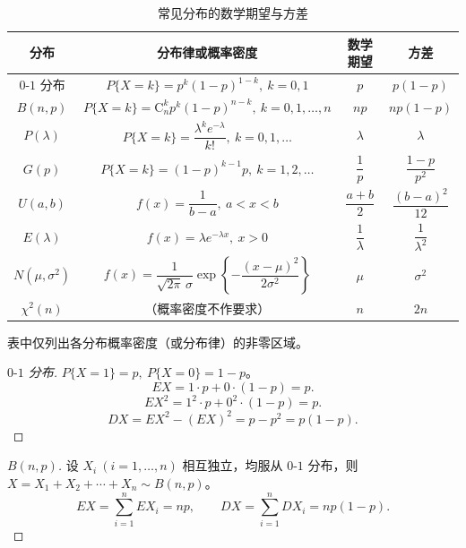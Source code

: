 \documentclass[lang=cn,11pt]{elegantbook}
\begin{document}
\begin{table}[htbp]
    \centering
    \caption{常见分布的数学期望与方差} \label{tab:common-ev}
    \begin{tabular}{cccc}
        \toprule
        分布 & 分布律或概率密度 & 数学期望 & 方差 \\
        \midrule
        \(0\text{-}1\) 分布 & \(P\{X=k\} = p^k(1-p)^{1-k},\ k=0,1\) & \(p\) & \(p(1-p)\) \\[6pt]
        \(B(n,p)\) & \(P\{X=k\} = \mathrm{C}_n^k p^k(1-p)^{n-k},\ k=0,1,\dots,n\) & \(np\) & \(np(1-p)\) \\[6pt]
        \(P(\lambda)\) & \(P\{X=k\} = \dfrac{\lambda^k e^{-\lambda}}{k!},\ k=0,1,\dots\) & \(\lambda\) & \(\lambda\) \\[6pt]
        \(G(p)\) & \(P\{X=k\} = (1-p)^{k-1}p,\ k=1,2,\dots\) & \(\dfrac{1}{p}\) & \(\dfrac{1-p}{p^2}\) \\[6pt]
        \(U(a,b)\) & \(f(x) = \dfrac{1}{b-a},\ a < x < b\) & \(\dfrac{a+b}{2}\) & \(\dfrac{(b-a)^2}{12}\) \\[6pt]
        \(E(\lambda)\) & \(f(x) = \lambda e^{-\lambda x},\ x > 0\) & \(\dfrac{1}{\lambda}\) & \(\dfrac{1}{\lambda^2}\) \\[6pt]
        \(N(\mu,\sigma^2)\) & \(f(x) = \dfrac{1}{\sqrt{2\pi}\,\sigma}\exp\!\left\{-\dfrac{(x-\mu)^2}{2\sigma^2}\right\}\) & \(\mu\) & \(\sigma^2\) \\[6pt]
        $\chi^2(n)$ & （概率密度不作要求） & \(n\) & \(2n\) \\
        \bottomrule
    \end{tabular}
\end{table}

\begin{note}
表中仅列出各分布概率密度（或分布律）的非零区域。
\end{note}

\begin{proof}[\(0\text{-}1\) 分布]
\(P\{X=1\}=p,\ P\{X=0\}=1-p\)。
\[EX = 1\cdot p + 0\cdot(1-p) = p.\]
\[EX^2 = 1^2\cdot p + 0^2\cdot(1-p) = p.\]
\[DX = EX^2 - (EX)^2 = p - p^2 = p(1-p).\]
\end{proof}

\begin{proof}[\(B(n,p)\)]
设 \(X_i\ (i=1,\dots,n)\) 相互独立，均服从 \(0\text{-}1\) 分布，则 \(X = X_1+X_2+\cdots+X_n \sim B(n,p)\)。
\[EX = \sum_{i=1}^{n}EX_i = np,\qquad DX = \sum_{i=1}^{n}DX_i = np(1-p).\]
\end{proof}
\end{document}
